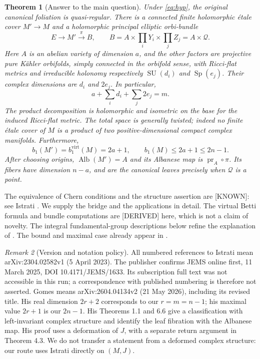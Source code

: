 \documentclass[12pt]{amsart}
\newtheorem{thm}{Theorem}[section]
\theoremstyle{definition}
\theoremstyle{remark}
\newtheorem{rem}[thm]{Remark}
\numberwithin{equation}{section}
\DeclareMathOperator{\pr}{pr}
\DeclareMathOperator{\Alb}{Alb}
\newcommand{\virt}{\mathrm{virt}}
\newcommand{\SU}{\operatorname{SU}}
\newcommand{\Sp}{\operatorname{Sp}}
\newcommand{\AIstatus}[1]{\textnormal{\textsf{[#1]}}}
\newcommand{\Qfac}{\mathcal{Q}}
\begin{document}
\begin{thm}[Answer to the main question]\label{thm:main}
Under \eqref{eq:hyp}, the original canonical foliation is quasi-regular.
There is a connected finite holomorphic \emph{\'etale} cover $M'\to M$ and
a holomorphic principal elliptic orbi-bundle
\begin{equation}\label{eq:BB}
E\longrightarrow M'\xrightarrow{\pi}B,
\qquad B=A\times\prod_i Y_i\times\prod_j Z_j=A\times\Qfac.
\end{equation}
Here $A$ is an abelian variety of dimension $a$, and the other factors are
projective pure K\"ahler orbifolds, simply connected in the \emph{orbifold}
sense, with Ricci-flat metrics and irreducible holonomy respectively
$\SU(d_i)$ and $\Sp(e_j)$. Their complex dimensions are $d_i$ and $2e_j$.
In particular,
\begin{equation}\label{eq:dimension}
a+\sum_i d_i+\sum_j2e_j=m.
\end{equation}
The product decomposition is holomorphic and isometric on the base for
the induced Ricci-flat metric. The total space is generally twisted; indeed
no finite \'etale cover of $M$ is a product of two positive-dimensional
compact complex manifolds. Furthermore,
\begin{equation}\label{eq:mainBetti}
b_1(M')=b_1^{\virt}(M)=2a+1,
\qquad b_1(M)\leq2a+1\leq2n-1.
\end{equation}
After choosing origins, $\Alb(M')=A$ and its Albanese map is
$\pr_A\circ\pi$. Its fibers have dimension $n-a$, and are the canonical
leaves precisely when $\Qfac$ is a point.
\end{thm}

The equivalence of Chern conditions and the structure assertion are
\AIstatus{KNOWN}: see Istrati \cite[Definition 4.1, Lemma 4.4,
Corollary 5.2, Theorem 5.3]{Istrati}. We supply the bridge and the
applications in detail. The virtual Betti formula and bundle computations
are \AIstatus{DERIVED} here, which is not a claim of novelty.
The integral fundamental-group descriptions below refine the explanation
of \cite[Corollary 5.10]{Istrati}. The bound and maximal case already appear
in \cite[Corollary 5.11]{Istrati}.

\begin{rem}[Version and notation policy]\label{rem:versions}
All numbered references to Istrati mean arXiv:2304.02582v1 (5 April 2023).
The publisher confirms JEMS online first, 11 March 2025,
DOI 10.4171/JEMS/1633. Its subscription full text was not accessible in this
run; a correspondence with published numbering is therefore not asserted.
Gomes means arXiv:2604.04134v2 (21 May 2026), including its revised title.
His real dimension $2r+2$ corresponds to our $r=m=n-1$; his maximal value
$2r+1$ is our $2n-1$. His Theorems 1.1 and 6.6 give a classification with
left-invariant complex structure and identify the leaf fibration with the
Albanese map. His proof uses a deformation of $J$, with a separate return
argument in Theorem 4.3. We do not transfer a statement from a deformed
complex structure: our route uses Istrati directly on $(M,J)$.
\end{rem}
\end{document}
